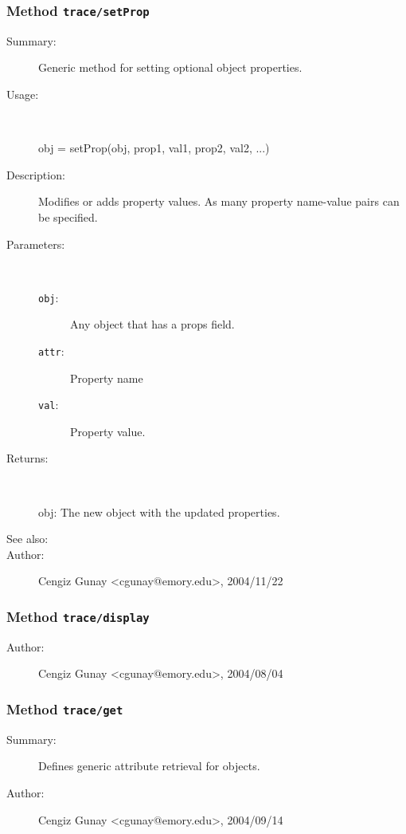 \subsubsection[Method \texttt{setProp}]{Method \texttt{trace/setProp}}%
%
\label{ref_trace__setProp}%
\hypertarget{ref_trace__setProp}{}%
\begin{description}
\item[Summary:]Generic method for setting optional object properties.
%
\item[Usage:]~%
\begin{lyxcode}%
obj = setProp(obj, prop1, val1, prop2, val2, ...)
%
\end{lyxcode}%
%
\item[Description:]%
Modifies or adds property values. As many property name-value 
 pairs can be specified.
\item[Parameters:]~
\begin{description}%
\item[\texttt{obj}:]
 Any object that has a props field.
\item[\texttt{attr}:]
 Property name
\item[\texttt{val}:]
 Property value.
\end{description}%
%
\item[Returns:]~

	obj: The new object with the updated properties.
%
%
\item[See also:]%
%
\item[Author:]%
Cengiz Gunay <cgunay@emory.edu>, 2004/11/22%
\end{description}
\methodline%
\subsubsection[Method \texttt{display}]{Method \texttt{trace/display}}%
%
\label{ref_trace__display}%
\hypertarget{ref_trace__display}{}%
\begin{description}
%
%
%
%
%
%
%
\item[Author:]%
Cengiz Gunay <cgunay@emory.edu>, 2004/08/04%
\end{description}
\methodline%
\subsubsection[Method \texttt{get}]{Method \texttt{trace/get}}%
%
\label{ref_trace__get}%
\hypertarget{ref_trace__get}{}%
\begin{description}
\item[Summary:]Defines generic attribute retrieval for objects.
%
%
%
%
%
%
%
\item[Author:]%
Cengiz Gunay <cgunay@emory.edu>, 2004/09/14%
\end{description}
\methodline%
